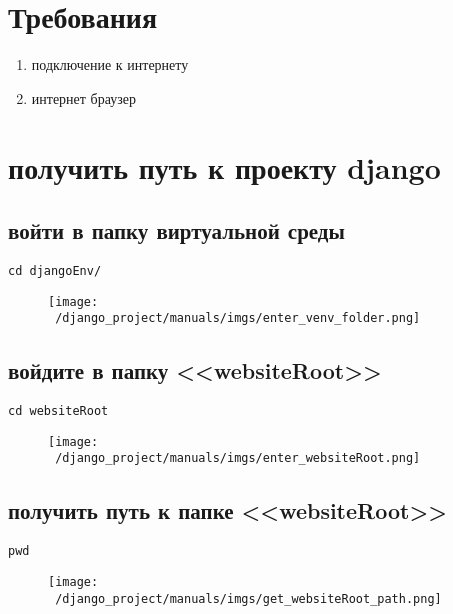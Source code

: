 \documentclass[12pt]{article}
\begin{document}
\tableofcontents
\newpage
\setcounter{page}{1}%
\section{Требования}
\begin{enumerate}
	\item подключение к интернету
  \item интернет браузер
\end{enumerate}

\section{получить путь к проекту django}

    \subsection{ войти в папку виртуальной среды}
			\begin{lstlisting}[caption=\phantom{},style=conlst,label={lst:enter_desktop}]
      cd djangoEnv/
			\end{lstlisting}
	\begin{figure}[H]
		\centering
		\texttt{[image: ~/django\_project/manuals/imgs/enter\_venv\_folder.png]}
		\caption{}
	\end{figure}

    \subsection{войдите в папку <<websiteRoot>>}
			\begin{lstlisting}[caption=\phantom{},style=conlst,label={lst:enter_desktop}]
      cd websiteRoot
			\end{lstlisting}
	\begin{figure}[H]
		\centering
		\texttt{[image: ~/django\_project/manuals/imgs/enter\_websiteRoot.png]}
		\caption{}
	\end{figure}

    \subsection{получить путь к папке <<websiteRoot>>}
			\begin{lstlisting}[caption=\phantom{},style=conlst,label={lst:enter_desktop}]
      pwd
			\end{lstlisting}
	\begin{figure}[H]
		\centering
		\texttt{[image: ~/django\_project/manuals/imgs/get\_websiteRoot\_path.png]}
		\caption{}
	\end{figure}
\end{document}
